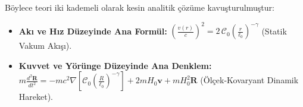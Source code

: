 Böylece teori iki kademeli olarak kesin analitik çözüme kavuşturulmuştur:
\begin{itemize}
    \item \textbf{Akı ve Hız Düzeyinde Ana Formül:} $\left(\frac{v(r)}{c}\right)^2 = 2 \, \mathcal{C}_0 \left(\frac{r}{\ell_0}\right)^{-\gamma}$ (Statik Vakum Akışı).
    \item \textbf{Kuvvet ve Yörünge Düzeyinde Ana Denklem:} $m \frac{d^2\mathbf{R}}{dt^2} = - m c^2 \nabla \left[ \mathcal{C}_0 \left(\frac{R}{\ell_0}\right)^{-\gamma} \right] + 2 m H_0 \mathbf{v} + m H_0^2 \mathbf{R}$ (Ölçek-Kovaryant Dinamik Hareket).
\end{itemize}

